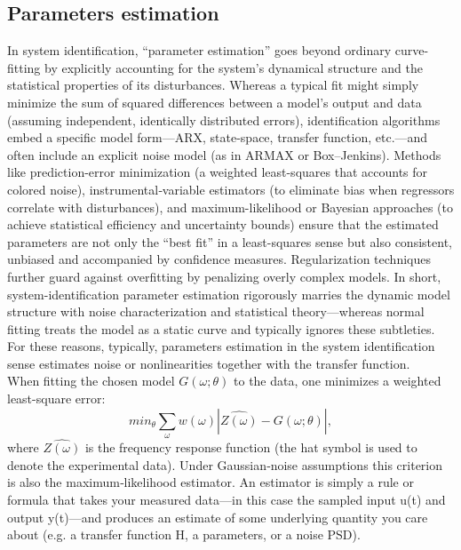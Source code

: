 \subsection{Parameters estimation}
In system identification, “parameter estimation” goes beyond ordinary curve-fitting by explicitly accounting for the system’s dynamical structure and the statistical properties of its disturbances. Whereas a typical fit might simply minimize the sum of squared differences between a model’s output and data (assuming independent, identically distributed errors), identification algorithms embed a specific model form—ARX, state-space, transfer function, etc.—and often include an explicit noise model (as in ARMAX or Box–Jenkins). Methods like prediction-error minimization (a weighted least-squares that accounts for colored noise), instrumental‐variable estimators (to eliminate bias when regressors correlate with disturbances), and maximum-likelihood or Bayesian approaches (to achieve statistical efficiency and uncertainty bounds) ensure that the estimated parameters are not only the “best fit” in a least-squares sense but also consistent, unbiased and accompanied by confidence measures. Regularization techniques further guard against overfitting by penalizing overly complex models. In short, system-identification parameter estimation rigorously marries the dynamic model structure with noise characterization and statistical theory—whereas normal fitting treats the model as a static curve and typically ignores these subtleties.\\
For these reasons, typically, parameters estimation in the system identification sense estimates noise or nonlinearities together with the transfer function.\\
When fitting the chosen model $G(\omega; \theta)$ to the data, one minimizes a weighted least-square error:
$$
min_{\theta} \sum_{\omega} w(\omega) | \hat{Z(\omega)}-G(\omega;\theta)|,
$$
where $\hat{Z(\omega)}$ is the frequency response function (the hat symbol is used to denote the experimental data). Under Gaussian‐noise assumptions this criterion is also the maximum‐likelihood estimator. An estimator is simply a rule or formula that takes your measured data—in this case the sampled input u(t) and output y(t)—and produces an estimate of some underlying quantity you care about (e.g. a transfer function H, a parameters, or a noise PSD).
